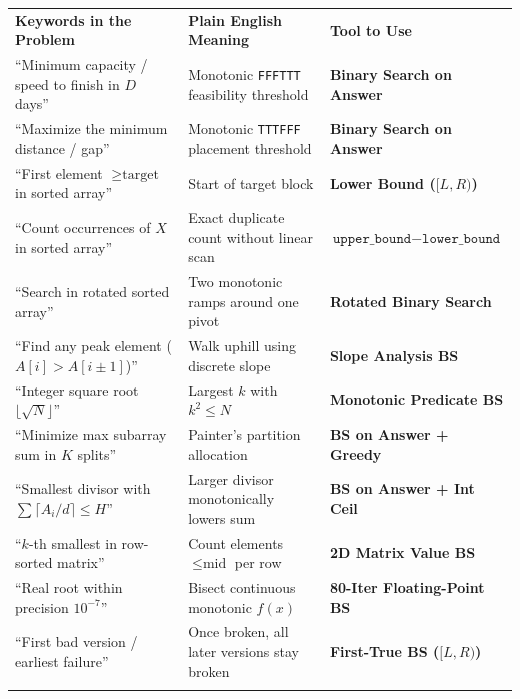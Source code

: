 \documentclass[11pt,a4paper]{article}
\theoremstyle{definition}
\begin{document}
\begingroup\small{}
\begin{tabularx}{\textwidth}{>{\raggedright\arraybackslash}p{4.3cm} >{\raggedright\arraybackslash}X >{\raggedright\arraybackslash\bfseries}p{4.1cm}}
\arrayrulecolor{primaryblue}\toprule[1.2pt]
\rowcolor{primaryblue!10}
\textcolor{primaryblue}{\textbf{Keywords in the Problem}} & \textcolor{primaryblue}{\textbf{Plain English Meaning}} & \textcolor{primaryblue}{\textbf{Tool to Use}} \\
\arrayrulecolor{codeframe}\midrule[0.6pt]
``Minimum capacity / speed to finish in $D$ days'' & Monotonic \texttt{FFFTTT} feasibility threshold & Binary Search on Answer \\
``Maximize the minimum distance / gap'' & Monotonic \texttt{TTTFFF} placement threshold & Binary Search on Answer \\
``First element $\ge \text{target}$ in sorted array'' & Start of target block & Lower Bound ($[L, R)$) \\
``Count occurrences of $X$ in sorted array'' & Exact duplicate count without linear scan & $\texttt{upper\_bound} - \texttt{lower\_bound}$ \\
``Search in rotated sorted array'' & Two monotonic ramps around one pivot & Rotated Binary Search \\
``Find any peak element ($A[i] > A[i\pm 1]$)'' & Walk uphill using discrete slope & Slope Analysis BS \\
``Integer square root $\lfloor \sqrt{N} \rfloor$'' & Largest $k$ with $k^2 \le N$ & Monotonic Predicate BS \\
``Minimize max subarray sum in $K$ splits'' & Painter's partition allocation & BS on Answer + Greedy \\
``Smallest divisor with $\sum \lceil A_i / d \rceil \le H$'' & Larger divisor monotonically lowers sum & BS on Answer + Int Ceil \\
``$k$-th smallest in row-sorted matrix'' & Count elements $\le \text{mid}$ per row & 2D Matrix Value BS \\
``Real root within precision $10^{-7}$'' & Bisect continuous monotonic $f(x)$ & 80-Iter Floating-Point BS \\
``First bad version / earliest failure'' & Once broken, all later versions stay broken & First-True BS ($[L, R)$) \\
\arrayrulecolor{primaryblue}\bottomrule[1.2pt]
\end{tabularx}\endgroup

\end{document}
